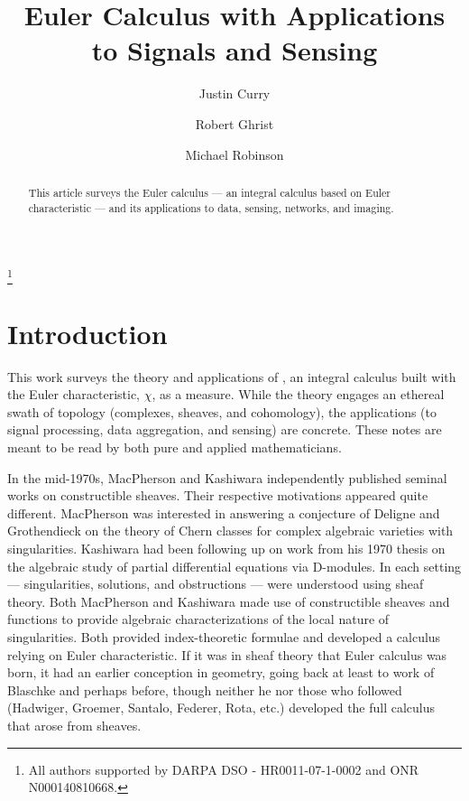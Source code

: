 \documentclass{psapm-l}
\theoremstyle{definition}
\theoremstyle{remark}
\numberwithin{equation}{section}
\begin{document}
\title{Euler Calculus with Applications to Signals and Sensing}

\author{Justin Curry}
\address{Department of Mathematics, University of Pennsylvania}

\author{Robert Ghrist}
\address{Departments of Mathematics and Electrical/Systems Engineering, University of Pennsylvania}
\thanks{All authors supported by DARPA DSO - HR0011-07-1-0002 and ONR N000140810668.}

\author{Michael Robinson}
\address{Department of Mathematics, University of Pennsylvania}



\begin{abstract}
This article surveys the Euler calculus --- an integral calculus based on Euler characteristic --- and its applications to data, sensing, networks, and imaging.
\end{abstract}

\maketitle

\section{Introduction}
\label{sec:intro}

This work surveys the theory and applications of {{}}, an integral calculus built with the Euler characteristic, $\chi$, as a measure. While the theory engages an ethereal swath of topology (complexes, sheaves, and cohomology), the applications (to signal processing, data aggregation, and sensing) are concrete. These notes are meant to be read by both pure and applied mathematicians.

In the mid-1970s, MacPherson \cite{MacPherson} and Kashiwara \cite{Kashiwara} independently published seminal works on constructible sheaves. Their respective motivations appeared quite different. MacPherson was interested in  answering a conjecture of Deligne and Grothendieck on the theory of Chern classes for  complex algebraic varieties with singularities. Kashiwara had been following up on work from his 1970 thesis on the algebraic study of partial differential equations via D-modules. In each setting --- singularities, solutions, and obstructions ---  were understood using sheaf theory. Both MacPherson and Kashiwara made use of constructible sheaves and functions to provide algebraic characterizations of the local nature of singularities. Both provided index-theoretic formulae and developed a calculus relying on Euler characteristic. If it was in sheaf theory that Euler calculus was born, it had an earlier conception in geometry, going back at least to work of Blaschke \cite{Blaschke} and perhaps before, though neither he nor those who followed (Hadwiger, Groemer, Santalo, Federer, Rota, etc.) developed the full calculus that arose from sheaves.
\end{document}
